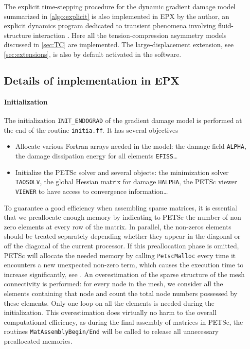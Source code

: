 The explicit time-stepping procedure for the dynamic gradient damage model summarized in \cref{algo:explicit} is also implemented in EPX by the author, an explicit dynamics program dedicated to transient phenomena involving fluid-structure interaction \cite{EPX:2015}. Here all the tension-compression asymmetry models discussed in \cref{sec:TC} are implemented. The large-displacement extension, see \cref{sec:extensions}, is also by default activated in the software.

\subsection{Details of implementation in EPX} \label{sec:epx}
\paragraph{Initialization}
The initialization \texttt{INIT\_ENDOGRAD} of the gradient damage model is performed at the end of the routine \texttt{initia.ff}. It has several objectives
\begin{itemize}
\item Allocate various Fortran arrays needed in the model: the damage field \texttt{ALPHA}, the damage dissipation energy for all elements \texttt{EFISS}\ldots

\item Initialize the PETSc solver and several objects: the minimization solver \texttt{TAOSOLV}, the global Hessian matrix for damage \texttt{HALPHA}, the PETSc viewer \texttt{VIEWER} to have access to convergence information\ldots
\end{itemize}

To guarantee a good efficiency when assembling sparse matrices, it is essential that we preallocate enough memory by indicating to PETSc the number of non-zero elements at every row of the matrix. In parallel, the non-zeros elements should be treated separately depending whether they appear in the diagonal or off the diagonal of the current processor. If this preallocation phase is omitted, PETSc will allocate the needed memory by calling \texttt{PetscMalloc} every time it encounters a new unexpected non-zero term, which causes the execution time to increase significantly, see \cite{PETSc:2015}. An overestimation of the sparse structure of the mesh connectivity is performed: for every node in the mesh, we consider all the elements containing that node and count the total node numbers possessed by these elements. Only one loop on all the elements is needed during the initialization. This overestimation does virtually no harm to the overall computational efficiency, as during the final assembly of matrices in PETSc, the routines \texttt{MatAssemblyBegin/End} will be called to release all unnecessary preallocated memories.


